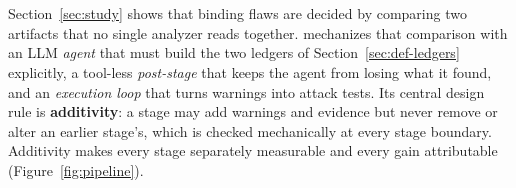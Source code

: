\section{\tool{}}\label{sec:design}

Section~\ref{sec:study} shows that binding flaws are decided by comparing two
artifacts that no single analyzer reads together. \tool{} mechanizes that
comparison with an LLM \emph{agent} that must build the two ledgers of
Section~\ref{sec:def-ledgers} explicitly, a tool-less \emph{post-stage} that
keeps the agent from losing what it found, and an \emph{execution loop} that
turns warnings into attack tests. Its central design rule is
\textbf{additivity}: a stage may add warnings and evidence but never remove or
alter an earlier stage's, which is checked mechanically at every stage
boundary. Additivity makes every stage separately measurable and every gain
attributable (Figure~\ref{fig:pipeline}).

